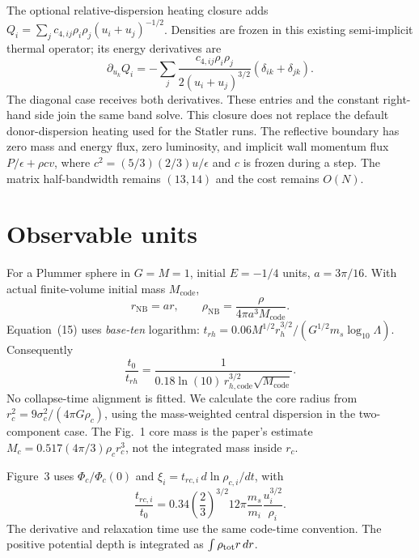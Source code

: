 \documentclass[11pt]{article}
\begin{document}
The optional relative-dispersion heating closure adds
$Q_i=\sum_j c_{4,ij}\rho_i\rho_j(u_i+u_j)^{-1/2}$.
Densities are frozen in this existing semi-implicit thermal operator; its
energy derivatives are
\begin{equation}
 \partial_{u_k}Q_i=-\sum_j\frac{c_{4,ij}\rho_i\rho_j}
                  {2(u_i+u_j)^{3/2}}(\delta_{ik}+\delta_{jk}).
\end{equation}
The diagonal case receives both derivatives. These entries and the constant
right-hand side join the same band solve. This closure does not replace the
default donor-dispersion heating used for the Statler runs.
The reflective boundary has zero mass and energy flux, zero luminosity,
and implicit wall momentum flux $P/\epsilon+\rho cv$, where
$c^2=(5/3)(2/3)u/\epsilon$ and $c$ is frozen during a step. The matrix
half-bandwidth remains $(13,14)$ and the cost remains $O(N)$.

\section{Observable units}
For a Plummer sphere in $G=M=1$, initial $E=-1/4$ units,
$a=3\pi/16$. With actual finite-volume initial mass $M_{\mathrm{code}}$,
\begin{equation}
 r_{\mathrm{NB}}=ar,\qquad
 \rho_{\mathrm{NB}}=\frac{\rho}{4\pi a^3M_{\mathrm{code}}}.
\end{equation}
Equation~(15) uses \emph{base-ten} logarithm:
$t_{rh}=0.06M^{1/2}r_h^{3/2}/(G^{1/2}m_s\log_{10}\Lambda)$.
Consequently
\begin{equation}
 \frac{t_0}{t_{rh}}=
 \frac{1}{0.18\ln(10)\,r_{h,\mathrm{code}}^{3/2}\sqrt{M_{\mathrm{code}}}}.
\end{equation}
No collapse-time alignment is fitted. We calculate the core radius from
$r_c^2=9\sigma_c^2/(4\pi G\rho_c)$, using the mass-weighted central
dispersion in the two-component case. The Fig.~1 core mass is the paper's
estimate $M_c=0.517(4\pi/3)\rho_c r_c^3$, not the integrated mass inside $r_c$.

Figure~3 uses $\Phi_c/\Phi_c(0)$ and
$\xi_i=t_{rc,i}\,d\ln\rho_{c,i}/dt$, with
\begin{equation}
 \frac{t_{rc,i}}{t_0}=0.34\left(\frac23\right)^{3/2}12\pi
        \frac{m_s}{m_i}\frac{u_i^{3/2}}{\rho_i}.
\end{equation}
The derivative and relaxation time use the same code-time convention.
The positive potential depth is integrated as $\int\rho_{\rm tot}r\,dr$.
\end{document}
